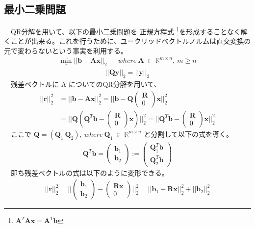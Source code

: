 \documentclass[a4paper,10pt]{jarticle}
\begin{document}
\subsection{最小二乗問題}
\label{sec:org2ec464e}
　QR分解を用いて、以下の最小二乗問題を 正規方程式 \footnote{\(\bm{A}^T\bm{A}\bm{x} = \bm{A}^T\bm{b}\)}を形成することなく解くことが出来る。これを行うために、ユークリッドベクトルノルムは直交変換の元で変わらないという事実を利用する。\\
\begin{align}
\min_{x}||\bm{b}-\bm{A}\bm{x}||_2&&where\ \bm{A}\ \in\ \mathbb{R}^{m\times n},\ m\geq n
\end{align}
\begin{align*}
||\bm{Q}\bm{y}||_2=||\bm{y}||_2  
\end{align*}
　残差ベクトルに A についてのQR分解を用いて、\\
\begin{align*}
||\bm{r}||_2^2&=||\bm{b}-\bm{A}\bm{x}||_2^2=||\bm{b}-\bm{Q}\begin{pmatrix}\bm{R}\\0\end{pmatrix}\bm{x}||^2_2 \\
&=||\bm{Q}(\bm{Q}^T\bm{b}-\begin{pmatrix}\bm{R}\\0\end{pmatrix}\bm{x})||^2_2=||\bm{Q}^T\bm{b}-\begin{pmatrix}\bm{R}\\0\end{pmatrix}\bm{x}
||^2_2
\end{align*}
　ここで \(\bm{Q}=(\bm{Q}_1\ \bm{Q}_2),\ where\ \bm{Q}_1\ \in\ \mathbb{R}^{m\times n}\) と分割して以下の式を導く。\\
 \begin{align*}
\bm{Q}^T\bm{b}=\begin{pmatrix}\bm{b}_1\\\bm{b}_2\end{pmatrix}:=\begin{pmatrix}\bm{Q}^T_1\bm{b}\\\bm{Q}^T_2\bm{b}\end{pmatrix}
\end{align*}
　即ち残差ベクトルの式は以下のように変形できる。\\
\begin{align}
||\bm{r}||^2_2=||\begin{pmatrix}\bm{b}_1\\\bm{b}_2\end{pmatrix}-\begin{pmatrix}\bm{R}\bm{x}\\0\end{pmatrix}||^2_2=||\bm{b}_1-\bm{R}\bm{x}||^2_2+||\bm{b}_2||^2_2
\tag{1}
\end{align}
\end{document}
